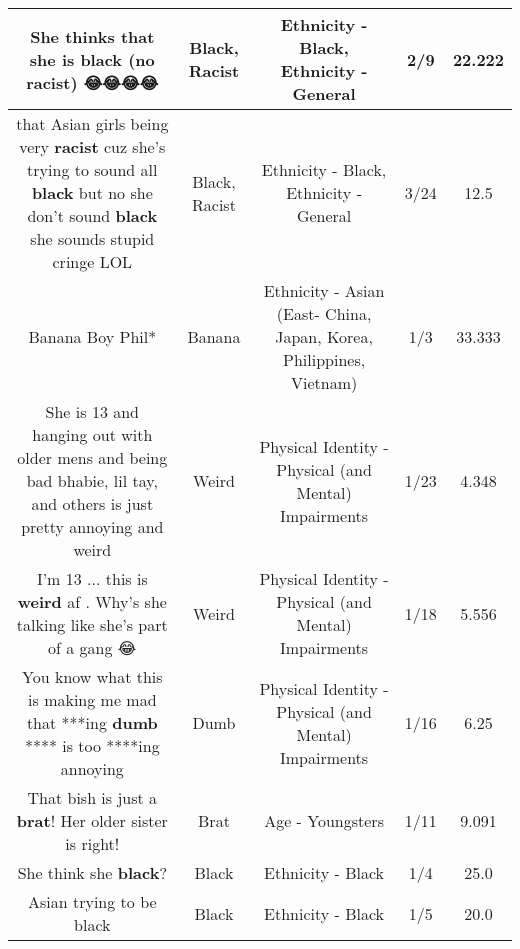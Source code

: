 \documentclass[11pt]{article}
\newlength\mylength
\begin{document}
\begin{center}
\begin{longtable}{|C{.65\mylength}|C{.30\mylength}|C{.12\mylength}|C{.12\mylength}|C{.12\mylength}|}
  \small She thinks that she is \textbf{black}  (no \textbf{racist}) 😂😂😂😂\normalsize   & Black, Racist & Ethnicity - Black, Ethnicity - General & 2/9 & 22.222 \\  \hline
  \small that Asian girls being very \textbf{racist} cuz she's trying to sound all \textbf{black} but no she don't sound \textbf{black} she sounds stupid cringe LOL\normalsize   & Black, Racist & Ethnicity - Black, Ethnicity - General & 3/24 & 12.5 \\  \hline
  \small Banana Boy Phil*\normalsize   & Banana & Ethnicity - Asian (East- China, Japan, Korea, Philippines, Vietnam) & 1/3 & 33.333 \\  \hline
  \small She is 13 and hanging out with older mens and being bad bhabie, lil tay, and others is just pretty annoying and weird\normalsize   & Weird & Physical Identity - Physical (and Mental) Impairments & 1/23 & 4.348 \\  \hline
  \small I'm 13 ... this is \textbf{weird} af . Why's she talking like she's part of a gang 😂\normalsize   & Weird & Physical Identity - Physical (and Mental) Impairments & 1/18 & 5.556 \\  \hline
  \small You know what this is making me mad that ***ing \textbf{dumb} **** is too ****ing annoying\normalsize   & Dumb & Physical Identity - Physical (and Mental) Impairments & 1/16 & 6.25 \\  \hline
  \small That bish is just a \textbf{brat}! Her older sister is right!\normalsize   & Brat & Age - Youngsters & 1/11 & 9.091 \\  \hline
  \small She think she \textbf{black}?\normalsize   & Black & Ethnicity - Black & 1/4 & 25.0 \\  \hline
  \small Asian trying to be black\normalsize   & Black & Ethnicity - Black & 1/5 & 20.0 \\  \hline

\end{longtable}
\end{center}
\end{document}
